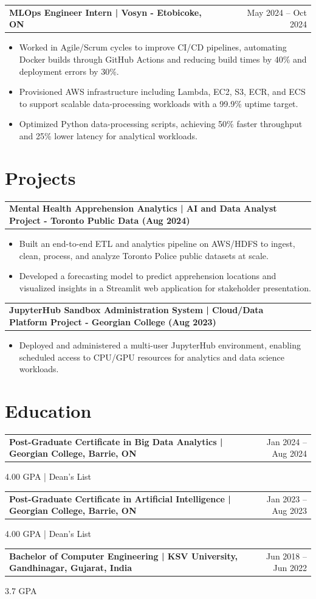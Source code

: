 \documentclass[10.5pt,letterpaper]{article}
\makeatletter
\newcommand{\resumeRow}[2]{%
  \noindent\begin{tabularx}{\linewidth}{@{}X r@{}}
    \textbf{#1} & #2 \\
  \end{tabularx}%
}
\makeatother
\begin{document}
\resumeRow{MLOps Engineer Intern | Vosyn - Etobicoke, ON}{May 2024 -- Oct 2024}
\begin{itemize}
  \item Worked in Agile/Scrum cycles to improve CI/CD pipelines, automating Docker builds through GitHub Actions and reducing build times by 40\% and deployment errors by 30\%.
  \item Provisioned AWS infrastructure including Lambda, EC2, S3, ECR, and ECS to support scalable data-processing workloads with a 99.9\% uptime target.
  \item Optimized Python data-processing scripts, achieving 50\% faster throughput and 25\% lower latency for analytical workloads.
\end{itemize}

\section{Projects}
\resumeRow{Mental Health Apprehension Analytics | AI and Data Analyst Project - Toronto Public Data (Aug 2024)}{}
\begin{itemize}
  \item Built an end-to-end ETL and analytics pipeline on AWS/HDFS to ingest, clean, process, and analyze Toronto Police public datasets at scale.
  \item Developed a forecasting model to predict apprehension locations and visualized insights in a Streamlit web application for stakeholder presentation.
\end{itemize}
\resumeRow{JupyterHub Sandbox Administration System | Cloud/Data Platform Project - Georgian College (Aug 2023)}{}
\begin{itemize}
  \item Deployed and administered a multi-user JupyterHub environment, enabling scheduled access to CPU/GPU resources for analytics and data science workloads.
\end{itemize}

\section{Education}
\resumeRow{Post-Graduate Certificate in Big Data Analytics | Georgian College, Barrie, ON}{Jan 2024 -- Aug 2024}
{\small 4.00 GPA | Dean's List}\\[0.2em]
\resumeRow{Post-Graduate Certificate in Artificial Intelligence | Georgian College, Barrie, ON}{Jan 2023 -- Aug 2023}
{\small 4.00 GPA | Dean's List}\\[0.2em]
\resumeRow{Bachelor of Computer Engineering | KSV University, Gandhinagar, Gujarat, India}{Jun 2018 -- Jun 2022}
{\small 3.7 GPA}\\[0.2em]
\end{document}
